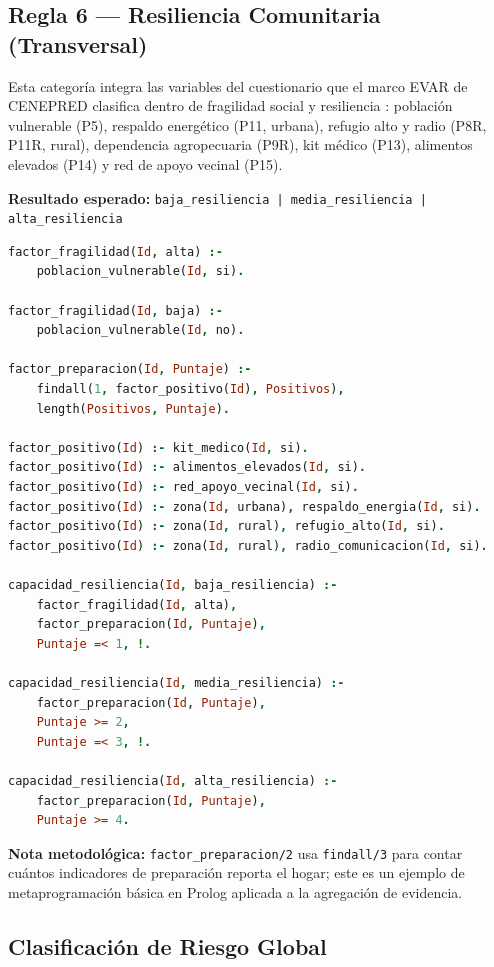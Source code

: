 \documentclass[12pt, letterpaper]{article}
\begin{document}
\subsection{Regla 6 — Resiliencia Comunitaria (Transversal)}

Esta categoría integra las variables del cuestionario que el marco EVAR de CENEPRED clasifica dentro de fragilidad social y resiliencia \parencite{cenepred_manual_evar}: población vulnerable (P5), respaldo energético (P11, urbana), refugio alto y radio (P8R, P11R, rural), dependencia agropecuaria (P9R), kit médico (P13), alimentos elevados (P14) y red de apoyo vecinal (P15).

\textbf{Resultado esperado:} \texttt{baja\_resiliencia | media\_resiliencia | alta\_resiliencia}

\begin{lstlisting}[language=Prolog, caption={Reglas de capacidad de resiliencia}]
factor_fragilidad(Id, alta) :-
    poblacion_vulnerable(Id, si).

factor_fragilidad(Id, baja) :-
    poblacion_vulnerable(Id, no).

factor_preparacion(Id, Puntaje) :-
    findall(1, factor_positivo(Id), Positivos),
    length(Positivos, Puntaje).

factor_positivo(Id) :- kit_medico(Id, si).
factor_positivo(Id) :- alimentos_elevados(Id, si).
factor_positivo(Id) :- red_apoyo_vecinal(Id, si).
factor_positivo(Id) :- zona(Id, urbana), respaldo_energia(Id, si).
factor_positivo(Id) :- zona(Id, rural), refugio_alto(Id, si).
factor_positivo(Id) :- zona(Id, rural), radio_comunicacion(Id, si).

capacidad_resiliencia(Id, baja_resiliencia) :-
    factor_fragilidad(Id, alta),
    factor_preparacion(Id, Puntaje),
    Puntaje =< 1, !.

capacidad_resiliencia(Id, media_resiliencia) :-
    factor_preparacion(Id, Puntaje),
    Puntaje >= 2,
    Puntaje =< 3, !.

capacidad_resiliencia(Id, alta_resiliencia) :-
    factor_preparacion(Id, Puntaje),
    Puntaje >= 4.
\end{lstlisting}

\textbf{Nota metodológica:} \texttt{factor\_preparacion/2} usa \texttt{findall/3} para contar cuántos indicadores de preparación reporta el hogar; este es un ejemplo de metaprogramación básica en Prolog aplicada a la agregación de evidencia.

\subsection{Clasificación de Riesgo Global}
\end{document}
